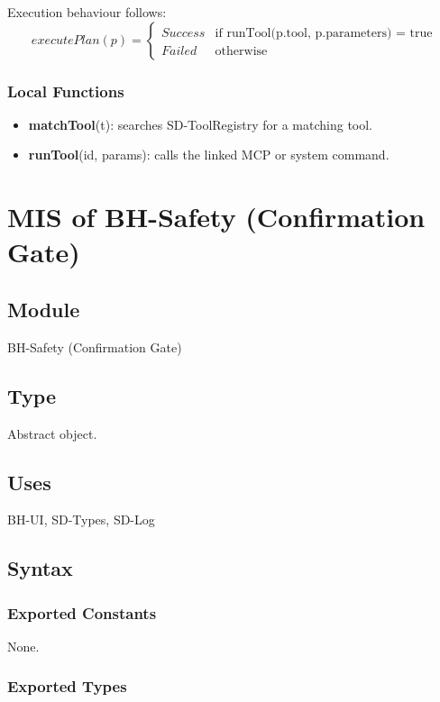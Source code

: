 \documentclass[12pt, titlepage]{article}
\begin{document}
\noindent
Execution behaviour follows:
\[
  executePlan(p) =
  \begin{cases}
    Success & \text{if runTool(p.tool, p.parameters) = true}\\
    Failed & \text{otherwise}
  \end{cases}
\]

\subsubsection{Local Functions}

\begin{itemize}
  \item \textbf{matchTool}(t): searches SD-ToolRegistry for a matching tool.
  \item \textbf{runTool}(id, params): calls the linked MCP or system command.
\end{itemize}

\section{MIS of BH-Safety (Confirmation Gate)} \label{mod:BHSafety}

\subsection{Module}

BH-Safety (Confirmation Gate)

\subsection{Type}

Abstract object.

\subsection{Uses}

BH-UI, SD-Types, SD-Log

\subsection{Syntax}

\subsubsection{Exported Constants}

None.

\subsubsection{Exported Types}
\end{document}
